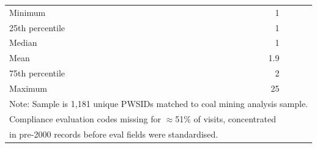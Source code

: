 \begin{table}[h!]
\begin{tabular}{lrr}
Minimum & 1 & \\
25th percentile & 1 & \\
Median & 1 & \\
Mean & 1.9 & \\
75th percentile & 2 & \\
Maximum & 25 & \\
\hline\hline
\multicolumn{3}{l}{\footnotesize Note: Sample is 1,181 unique PWSIDs matched to coal mining analysis sample.} \\
\multicolumn{3}{l}{\footnotesize Compliance evaluation codes missing for $\approx$51\% of visits, concentrated} \\
\multicolumn{3}{l}{\footnotesize in pre-2000 records before eval fields were standardised.} \\
\end{tabular}
\end{table}

